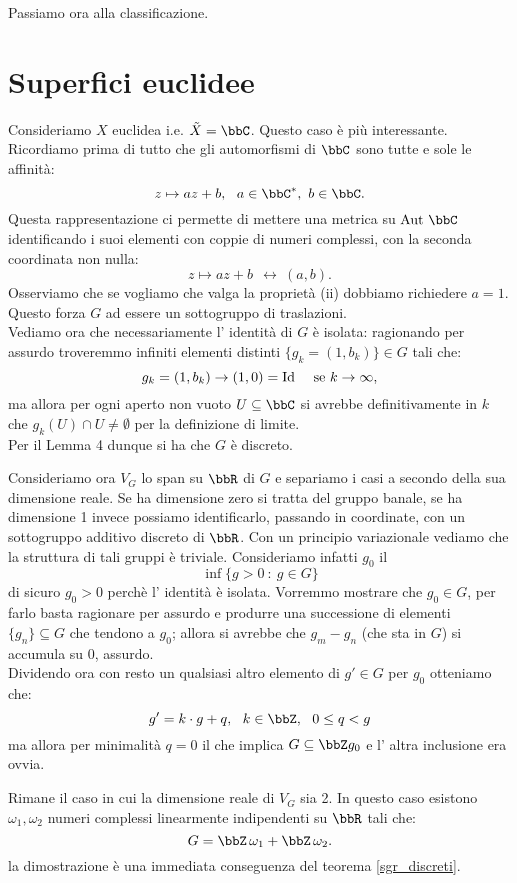 Passiamo ora alla classificazione.



\section{Superfici euclidee}

Consideriamo $X$ euclidea i.e. $\tilde{X}=\bbC$. Questo caso è più interessante. Ricordiamo prima di tutto che gli automorfismi di $\bbC$ sono tutte e sole le affinità:
$$
z\mapsto az+b,\ \ a\in\bbC^*,\ b\in \bbC.
$$
Questa rappresentazione ci permette di mettere una metrica su $\Aut{\bbC}$ identificando i suoi elementi con coppie di numeri complessi, con la seconda coordinata non nulla:
$$
z\mapsto az+b\ \ \leftrightarrow\  (a,b).
$$
Osserviamo che se vogliamo che valga la proprietà (ii) dobbiamo richiedere $a=1$. Questo forza $G$ ad essere un sottogruppo di traslazioni.\\
Vediamo ora che necessariamente l' identità di $G$ è isolata: ragionando per assurdo troveremmo infiniti elementi distinti $\{ g_k=(1,b_k) \}\in G$ tali che:
$$
g_k=(1,b_k)\rightarrow (1,0)=\Id\ \ \ \mbox{ se } k \rightarrow \infty,
$$
ma allora per ogni aperto non vuoto $U\subseteq \bbC$ si avrebbe definitivamente in $k$ che $g_k(U)\cap U\neq \emptyset$ per la definizione di limite.\\
Per il Lemma 4 dunque si ha che $G$ è discreto.

Consideriamo ora $V_G$ lo span su $\bbR$ di $G$ e separiamo i casi a secondo della sua dimensione reale. Se ha dimensione zero si tratta del gruppo banale, se ha dimensione 1 invece possiamo identificarlo, passando in coordinate, con un sottogruppo additivo discreto di $\bbR$. Con un principio variazionale vediamo che la struttura di tali gruppi è triviale. Consideriamo infatti $g_0$ il
$$
\inf\{g>0\ :\ g\in G\}
$$
di sicuro $g_0>0$ perchè l' identità è isolata. Vorremmo mostrare che $g_0\in G$, per farlo basta ragionare per assurdo e produrre una successione di elementi $\{g_n\}\subseteq G $ che tendono a $g_0$; allora si avrebbe che $g_m-g_n$ (che sta in $G$) si accumula su $0$, assurdo.\\
Dividendo ora con resto un qualsiasi altro elemento di $g'\in G$ per $g_0$ otteniamo che:
$$
g'=k\cdot g+q,\ \ k\in \bbZ,\ \ 0\leq q <g
$$
ma allora per minimalità $q=0$ il che implica $G\subseteq \bbZ g_0$ e l' altra inclusione era ovvia.

Rimane il caso in cui la dimensione reale di $V_G$ sia 2. In questo caso esistono $\omega_1,\omega_2$ numeri complessi linearmente indipendenti su $\bbR$ tali che:
$$
G=\bbZ\, \omega_1+\bbZ\, \omega_2.
$$
la dimostrazione è una immediata conseguenza del teorema \ref{sgr_discreti}.


